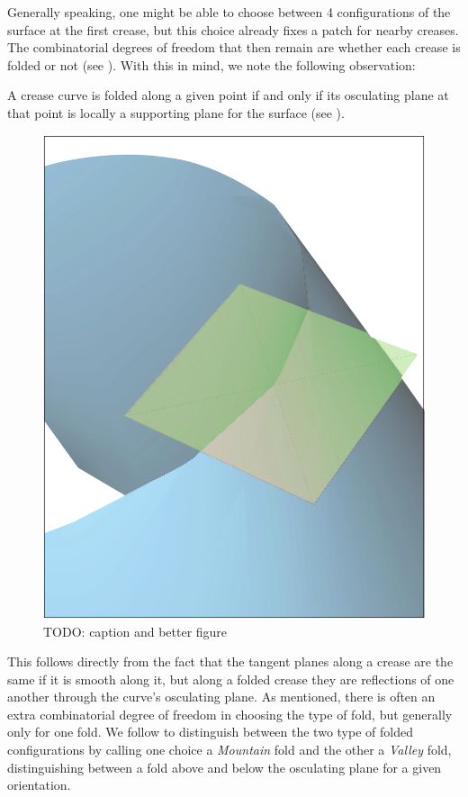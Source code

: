 Generally speaking, one might be able to choose between 4 configurations of the surface at the first crease, but this choice already fixes a patch for nearby creases. The combinatorial degrees of freedom that then remain are whether each crease is folded or not (see  ). With this in mind, we note the following observation:

\begin{theorem}\label{Thm:supporting_plane}
A crease curve is folded along a given point if and only if its osculating plane at that point is locally a supporting plane for the surface (see ).
\end{theorem}

\begin{figure} [h]
	\centering
	\includegraphics[width=0.5\linewidth]{figures/plane_side}
	\caption{TODO: caption and better figure}
	\label{fig:plane_side}
\end{figure}

This follows directly from the fact that the tangent planes along a crease are the same if it is smooth along it, but along a folded crease they are reflections of one another through the curve's osculating plane. As mentioned, there is often an extra combinatorial degree of freedom in choosing the type of fold, but generally only for one fold. We follow \cite{demaine_lens} to distinguish between the two type of folded configurations by calling one choice a \textit{Mountain} fold and the other a \textit{Valley} fold, distinguishing between a fold above and below the osculating plane for a given orientation. %


